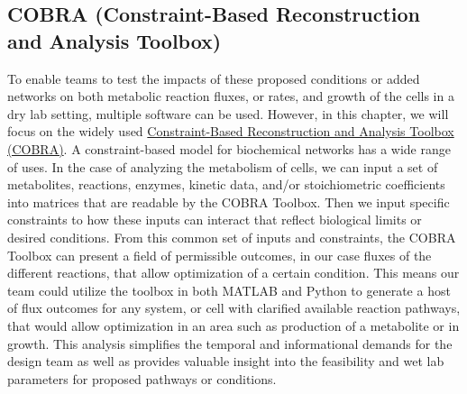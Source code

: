 \subsection{COBRA (Constraint-Based Reconstruction and Analysis Toolbox)}
To enable teams to test the impacts of these proposed conditions or added networks on both metabolic reaction fluxes, or rates, and growth of the cells in a dry lab setting, multiple software can be used. However, in this chapter, we will focus on the widely used \href{https://opencobra.github.io/cobratoolbox/stable/index.html}{Constraint-Based Reconstruction and Analysis Toolbox (COBRA)}. A constraint-based model for biochemical networks has a wide range of uses. In the case of analyzing the metabolism of cells, we can input a set of metabolites, reactions, enzymes, kinetic data, and/or stoichiometric coefficients into matrices that are readable by the COBRA Toolbox. Then we input specific constraints to how these inputs can interact that reflect biological limits or desired conditions. From this common set of inputs and constraints, the COBRA Toolbox can present a field of permissible outcomes, in our case fluxes of the different reactions, that allow optimization of a certain condition. This means our team could utilize the toolbox in both MATLAB and Python to generate a host of flux outcomes for any system, or cell with clarified available reaction pathways, that would allow optimization in an area such as production of a metabolite or in growth. This analysis simplifies the temporal and informational demands for the design team as well as provides valuable insight into the feasibility and wet lab parameters for proposed pathways or conditions.

